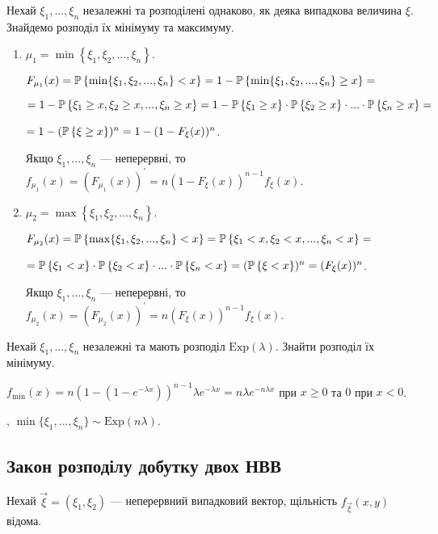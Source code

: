 Нехай $\xi_1, ..., \xi_n$ незалежні та розподілені однаково, як деяка випадкова величина $\xi$.
Знайдемо розподіл їх мінімуму та максимуму.
\begin{enumerate}
    \item $\mu_1 = \min\left\{\xi_1, \xi_2, ..., \xi_n\right\}$.

    $F_{\mu_1} (x) = \P \left\{ \min\{\xi_1, \xi_2, ..., \xi_n\} < x \right\} =
    1 - \P \left\{ \min\{\xi_1, \xi_2, ..., \xi_n\} \geq x \right\} =$

    $ = 1 - \P \left\{ \xi_1 \geq x, \xi_2 \geq x, ..., \xi_n \geq x \right\} = 
    1 - \P\left\{ \xi_1 \geq x\right\} \cdot \P\left\{ \xi_2 \geq x\right\} \cdot ... \cdot \P\left\{ \xi_n \geq x\right\} = $
    
    $ = 1 - (\P\left\{ \xi \geq x\right\})^n = 1 - (1- F_\xi (x))^n$.

    Якщо $\xi_1, ..., \xi_n$ --- неперервні, то $f_{\mu_1} (x) = \left( F_{\mu_1} (x)\right)^\prime = n (1- F_\xi (x))^{n-1} f_\xi(x)$.
    \item $\mu_2 = \max\left\{\xi_1, \xi_2, ..., \xi_n\right\}$.

    $F_{\mu_2} (x) = \P \left\{ \max\{\xi_1, \xi_2, ..., \xi_n\} < x \right\} =
    \P \left\{ \xi_1 < x, \xi_2 < x, ..., \xi_n < x \right\} = $

    $ = \P\left\{ \xi_1 < x\right\} \cdot \P\left\{ \xi_2 < x\right\} \cdot ... \cdot \P\left\{ \xi_n < x\right\} =
    (\P\left\{ \xi < x\right\})^n = (F_\xi (x))^n$.

    Якщо $\xi_1, ..., \xi_n$ --- неперервні, то $f_{\mu_2} (x) = \left( F_{\mu_2} (x)\right)^\prime = n (F_\xi (x))^{n-1} f_\xi(x)$.
\end{enumerate}

\begin{example}
    Нехай $\xi_1, ..., \xi_n$ незалежні та мають розподіл $\mathrm{Exp}(\lambda)$. Знайти розподіл їх мінімуму.

    \noindent$f_{\min}(x) = n (1-(1-e^{-\lambda x}))^{n-1} \lambda e^{-\lambda x} = n \lambda e^{-n\lambda x}$ при $x \geq 0$ та $0$ при $x < 0$.
    
    , $\min\{\xi_1, ..., \xi_n\} \sim \mathrm{Exp} (n \lambda)$.
\end{example}

\subsection{Закон розподілу добутку двох НВВ}
Нехай $\vec{\xi} = (\xi_1, \xi_2)$ --- неперервний випадковий вектор, щільність
$f_{\vec{\xi}}(x, y)$ відома.

